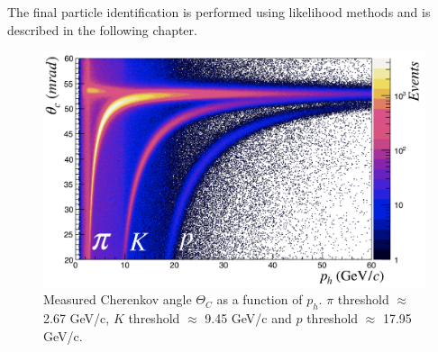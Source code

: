 The final particle identification is performed using likelihood methods and is described in the following chapter.

\begin{figure}[!h]
  \centering
	\includegraphics[scale=0.5]{./gfx/RICH.png}
	\caption{Measured Cherenkov angle $\Theta_C$ as a function of $p_h$. $\pi$ threshold $\approx$ 2.67 GeV/c, $K$ threshold $\approx$ 9.45 GeV/c and $p$ threshold $\approx$ 17.95 GeV/c.}
	\label{pic:RICH}
\end{figure}
